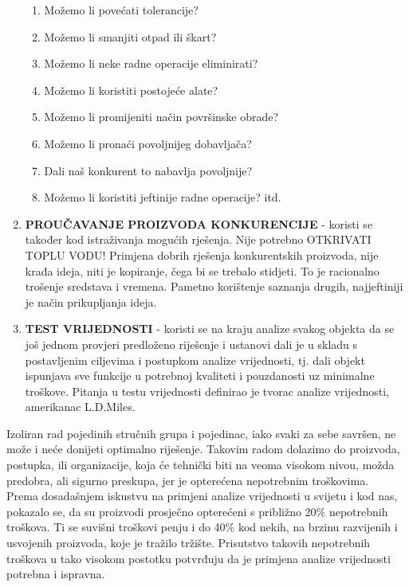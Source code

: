 \documentclass[a4paper,12pt]{article}
\numberwithin{figure}{section}
\begin{document}
\begin{enumerate}
\begin{center}
\begin{enumerate}
\item Možemo li povećati tolerancije?
\item Možemo li smanjiti otpad ili škart?
\item Možemo li neke radne operacije eliminirati?
\item Možemo li koristiti postojeće alate?
\item Možemo li promijeniti način površinske obrade?
\item Možemo li pronaći povoljnijeg dobavljača?
\item Dali naš konkurent to nabavlja povoljnije?
\item Možemo li koristiti jeftinije radne operacije? itd.
\end{enumerate}
\end{center} 
\item \textbf{PROUČAVANJE PROIZVODA KONKURENCIJE} - koristi se također kod istraživanja mogućih rješenja. Nije potrebno OTKRIVATI TOPLU VODU! Primjena dobrih rješenja konkurentskih proizvoda, nije krađa ideja, niti je kopiranje, čega bi se trebalo stidjeti. To je racionalno trošenje sredstava i vremena. Pametno korištenje saznanja drugih, najjeftiniji je način prikupljanja ideja.
\item \textbf{TEST VRIJEDNOSTI} - koristi se na kraju analize svakog objekta da se još jednom provjeri predloženo riješenje i ustanovi dali je  u skladu s postavljenim ciljevima i postupkom analize vrijednosti, tj. dali objekt ispunjava sve funkcije u potrebnoj kvaliteti i pouzdanosti uz minimalne troškove. Pitanja u testu vrijednosti definirao je tvorac analize vrijednosti, amerikanac L.D.Miles. 
\end{enumerate}
Izoliran rad pojedinih stručnih grupa i pojedinac, iako svaki za sebe savršen, ne može i neće donijeti optimalno riješenje. Takovim radom dolazimo do proizvoda, postupka, ili organizacije, koja će tehnički biti na veoma visokom nivou, možda predobra, ali sigurno preskupa, jer je opterećena nepotrebnim troškovima.\\
Prema dosadašnjem iskustvu na primjeni analize vrijednosti u svijetu i kod nas, pokazalo se, da su proizvodi prosječno opterećeni s približno 20\% nepotrebnih troškova. Ti se suvišni troškovi penju i do 40\% kod nekih, na brzinu razvijenih i usvojenih proizvoda, koje je tražilo tržište. Prisutstvo takovih nepotrebnih troškova u tako visokom postotku potvrđuju da je primjena analize vrijednosti potrebna i ispravna.\par
\end{document}
